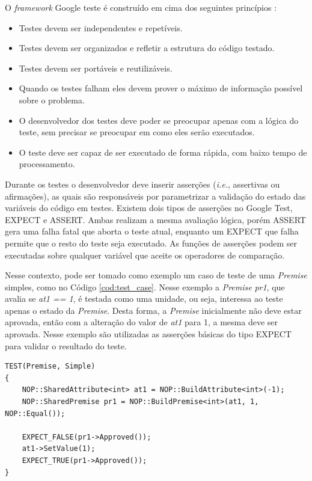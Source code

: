 O \textit{framework} Google teste é construído em cima dos seguintes princípios
\cite{google_test_primer}:

\begin{itemize}
  \item Testes devem ser independentes e repetíveis.
  \item Testes devem ser organizados e refletir a estrutura do código testado.
  \item Testes devem ser portáveis e reutilizáveis.
  \item Quando os testes falham eles devem prover o máximo de informação
        possível sobre o problema.
  \item O desenvolvedor dos testes deve poder se preocupar apenas com a lógica do
  teste, sem precisar se preocupar em como eles serão executados.
  \item O teste deve ser capaz de ser executado de forma rápida, com baixo tempo
  de processamento.
\end{itemize}

Durante os testes o desenvolvedor deve inserir asserções (\textit{i.e.},
assertivas ou afirmações), as quais são responsáveis por parametrizar a
validação do estado das variáveis do código em testes. Existem dois tipos de
asserções no Google Test, EXPECT e ASSERT. Ambas realizam a mesma avaliação
lógica, porém ASSERT gera uma falha fatal que aborta o teste atual, enquanto um
EXPECT que falha permite que o resto do teste seja executado.  As funções de
asserções podem ser executadas sobre qualquer variável que aceite os operadores
de comparação.

Nesse contexto, pode ser tomado como exemplo um caso de teste de uma
\textit{Premise} simples, como no Código \ref{cod:test_case}. Nesse exemplo a
\textit{Premise} \textit{pr1}, que avalia se \textit{at1 == 1}, é testada como
uma unidade, ou seja, interessa ao teste apenas o estado da \textit{Premise}.
Desta forma, a \textit{Premise} inicialmente não deve estar aprovada,
então com a alteração do valor de \textit{at1} para 1, a mesma deve ser
aprovada. Nesse exemplo são utilizadas as asserções básicas do tipo EXPECT para
validar o resultado do teste.

\begin{lstlisting}[caption = {Caso de teste com Google Test}, float=htb,
source = {Autoria própria}, label = {cod:test_case}]
TEST(Premise, Simple)
{
    NOP::SharedAttribute<int> at1 = NOP::BuildAttribute<int>(-1);
    NOP::SharedPremise pr1 = NOP::BuildPremise<int>(at1, 1, NOP::Equal());

    EXPECT_FALSE(pr1->Approved());
    at1->SetValue(1);
    EXPECT_TRUE(pr1->Approved());
}
\end{lstlisting}

